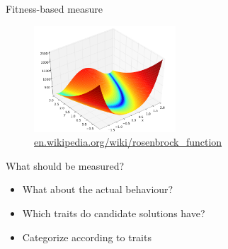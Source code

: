 \begin{frame}{Fitness-based measure}
  \begin{figure}
    \centering
    \includegraphics[height=150px]{elias/images/elevation.png}
    \caption{\url{en.wikipedia.org/wiki/rosenbrock_function}}
  \end{figure}
\end{frame}

\begin{frame}{What should be measured?}
  \begin{itemize}
    \item What about the actual behaviour?
    \item Which traits do candidate solutions have?
    \item Categorize according to traits
  \end{itemize}
\end{frame}


